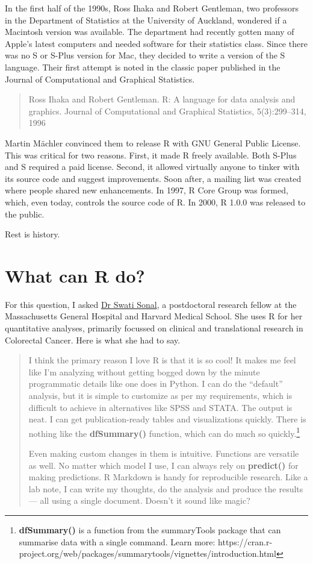 \documentclass[
  letterpaper,
  DIV=11,
  numbers=noendperiod]{scrartcl}
\begin{document}
In the first half of the 1990s, Ross Ihaka and Robert Gentleman, two
professors in the Department of Statistics at the University of
Auckland, wondered if a Macintosh version was available. The department
had recently gotten many of Apple's latest computers and needed software
for their statistics class. Since there was no S or S-Plus version for
Mac, they decided to write a version of the S language. Their first
attempt is noted in the classic paper published in the Journal of
Computational and Graphical Statistics.

\begin{quote}
Ross Ihaka and Robert Gentleman. R: A language for data analysis and
graphics. Journal of Computational and Graphical Statistics,
5(3):299--314, 1996
\end{quote}

Martin Mächler convinced them to release R with GNU General Public
License. This was critical for two reasons. First, it made R freely
available. Both S-Plus and S required a paid license. Second, it allowed
virtually anyone to tinker with its source code and suggest
improvements. Soon after, a mailing list was created where people shared
new enhancements. In 1997, R Core Group was formed, which, even today,
controls the source code of R. In 2000, R 1.0.0 was released to the
public.

Rest is history.

\hypertarget{what-can-r-do}{%
\section{What can R do?}\label{what-can-r-do}}

For this question, I asked \href{https://swatisonal.owlstown.net/}{Dr
Swati Sonal}, a postdoctoral research fellow at the Massachusetts
General Hospital and Harvard Medical School. She uses R for her
quantitative analyses, primarily focussed on clinical and translational
research in Colorectal Cancer. Here is what she had to say.

\begin{quote}
I think the primary reason I love R is that it is so cool! It makes me
feel like I'm analyzing without getting bogged down by the minute
programmatic details like one does in Python. I can do the ``default''
analysis, but it is simple to customize as per my requirements, which is
difficult to achieve in alternatives like SPSS and STATA. The output is
neat. I can get publication-ready tables and visualizations quickly.
There is nothing like the \textbf{dfSummary()} function, which can do
much so quickly.\footnote{\textbf{dfSummary()} is a function from the
  summaryTools package that can summarise data with a single command.
  Learn more:
  https://cran.r-project.org/web/packages/summarytools/vignettes/introduction.html}

Even making custom changes in them is intuitive. Functions are versatile
as well. No matter which model I use, I can always rely on
\textbf{predict()} for making predictions. R Markdown is handy for
reproducible research. Like a lab note, I can write my thoughts, do the
analysis and produce the results --- all using a single document.
Doesn't it sound like magic?
\end{quote}
\end{document}
